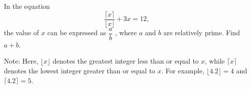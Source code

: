 In the equation \[\dfrac{\lceil x \rceil }{ \lfloor x \rfloor} + 3x = 12,\]the value of $x$ can be expressed as $\dfrac{a}{b}$ , where $a$ and $b$ are relatively prime. Find $a + b$.



Note: Here, $\lfloor x \rfloor$ denotes the greatest integer less than or equal to $x$, while $\lceil x \rceil$ denotes the lowest integer greater than or equal to $x$. For example, $\lfloor 4.2  \rfloor = 4$ and $\lceil 4.2\rceil  = 5$.
